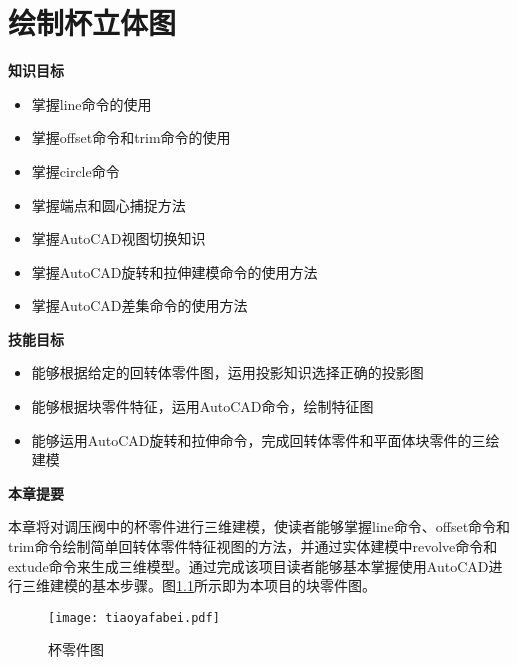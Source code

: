 \chapter{绘制杯立体图}
{\bfseries 知识目标}
\begin{itemize}
\item 掌握line命令的使用
\item 掌握offset命令和trim命令的使用
\item 掌握circle命令
\item 掌握端点和圆心捕捉方法
\item 掌握AutoCAD视图切换知识
\item 掌握AutoCAD旋转和拉伸建模命令的使用方法
\item 掌握AutoCAD差集命令的使用方法
\end{itemize}

{\bfseries 技能目标}
\begin{itemize}
\item 能够根据给定的回转体零件图，运用投影知识选择正确的投影图
\item 能够根据块零件特征，运用AutoCAD命令，绘制特征图
\item 能够运用AutoCAD旋转和拉伸命令，完成回转体零件和平面体块零件的三绘建模
\end{itemize}

{\bfseries 本章提要}

本章将对调压阀中的杯零件进行三维建模，使读者能够掌握line命令、offset命令和trim命令绘制简单回转体零件特征视图的方法，并通过实体建模中revolve命令和extude命令来生成三维模型。通过完成该项目读者能够基本掌握使用AutoCAD进行三维建模的基本步骤。图\ref{fig:tiaoyafabei}所示即为本项目的块零件图。
\noindent
\begin{figure}[htbp]
\centering
\texttt{[image: tiaoyafabei.pdf]}
\caption{杯零件图}\label{fig:tiaoyafabei}
\end{figure}
\endinput